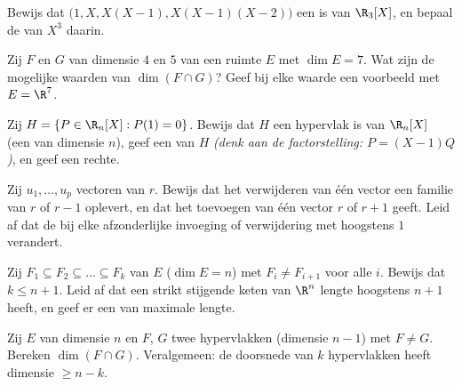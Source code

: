 \begin{exercise}[$\star$]\label{exo:b1:findim:4}
Bewijs dat $\bigl(1, X, X(X-1), X(X-1)(X-2)\bigr)$ een  is van
$\R_3[X]$, en bepaal de  van $X^3$ daarin.
\end{exercise}

\begin{exercise}[$\star\star$]\label{exo:b1:findim:5}
Zij $F$ en $G$  van dimensie $4$ en $5$ van een ruimte
$E$ met $\dim E = 7$. Wat zijn de mogelijke waarden van $\dim(F \cap
G)$? Geef bij elke waarde een voorbeeld met $E = \R^7$.
\end{exercise}

\begin{exercise}[$\star\star$]\label{exo:b1:findim:6}
Zij $H = \{P \in \R_n[X] : P(1) = 0\}$. Bewijs dat $H$ een
hypervlak is van $\R_n[X]$ (een  van dimensie $n$), geef
een  van $H$ \emph{(denk aan de factorstelling: $P = (X-1)Q$)},
en geef een  rechte.
\end{exercise}

\begin{exercise}[$\star\star$]\label{exo:b1:findim:7}
Zij $u_1, \dots, u_p$ vectoren van  $r$. Bewijs dat het
verwijderen van één vector een familie van  $r$ of $r - 1$
oplevert, en dat het toevoegen van één vector  $r$ of $r + 1$
geeft. Leid af dat de  bij elke afzonderlijke invoeging of
verwijdering met hoogstens $1$ verandert.
\end{exercise}

\begin{exercise}[$\star\star\star$]\label{exo:b1:findim:8}
Zij $F_1 \subseteq F_2 \subseteq \dots \subseteq F_k$ 
van $E$ ($\dim E = n$) met $F_i \neq F_{i+1}$ voor alle $i$. Bewijs
dat $k \leq n + 1$. Leid af dat een strikt stijgende keten
 van $\R^n$ lengte hoogstens $n + 1$ heeft, en geef er
een van maximale lengte.
\end{exercise}

\begin{exercise}[$\star\star\star$]\label{exo:b1:findim:9}
Zij $E$ van dimensie $n$ en $F$, $G$ twee hypervlakken (dimensie $n
- 1$) met $F \neq G$. Bereken $\dim(F \cap G)$. Veralgemeen: de
doorsnede van $k$ hypervlakken heeft dimensie $\geq n - k$.
\end{exercise}

